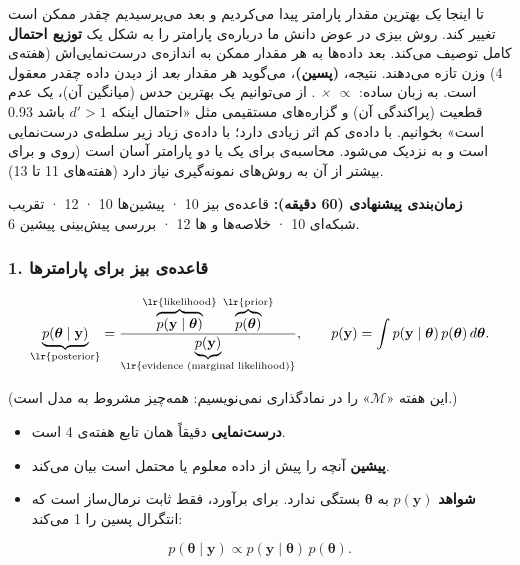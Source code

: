 تا اینجا \emph{یک} بهترین مقدار پارامتر پیدا می‌کردیم و بعد می‌پرسیدیم
چقدر ممکن است تغییر کند. روش بیزی در عوض دانش ما درباره‌ی پارامتر را به
شکل یک \textbf{توزیع احتمال} کامل توصیف می‌کند. بعد داده‌ها به هر مقدار
ممکن به اندازه‌ی درست‌نمایی‌اش (هفته‌ی 4) وزن تازه می‌دهند. نتیجه،
\textbf{ (پسین)}، می‌گوید هر مقدار \emph{بعد} از دیدن داده
چقدر معقول است. به زبان ساده: \emph{ \ensuremath{\propto}  ×
}. از  می‌توانیم یک بهترین حدس (میانگین آن)، یک
عدم قطعیت (پراکندگی آن) و گزاره‌های مستقیمی مثل «احتمال اینکه \(d' > 1\)
باشد 0.93 است» بخوانیم. با داده‌ی کم  اثر زیادی دارد؛ با داده‌ی
زیاد  زیر سلطه‌ی درست‌نمایی است و به  نزدیک می‌شود.
محاسبه‌ی  برای یک یا دو پارامتر آسان است (روی  و
برای بیشتر از آن به روش‌های نمونه‌گیری نیاز دارد (هفته‌های 11 تا 13).

\textbf{زمان‌بندی پیشنهادی (60 دقیقه):} قاعده‌ی بیز 10 · پیشین‌ها 10 ·
 12 · تقریب شبکه‌ای 10 · خلاصه‌ها و ها 12 · بررسی پیش‌بینی پیشین 6.

\subsubsection{1. قاعده‌ی بیز برای پارامترها}

\[
\underbrace{p(\boldsymbol\theta \mid \mathbf{y})}_{\text{\lr{posterior}}}
= \frac{\overbrace{p(\mathbf{y} \mid \boldsymbol\theta)}^{\text{\lr{likelihood}}}\;\overbrace{p(\boldsymbol\theta)}^{\text{\lr{prior}}}}{\underbrace{p(\mathbf{y})}_{\text{\lr{evidence (marginal likelihood)}}}},
\qquad
p(\mathbf{y}) = \int p(\mathbf{y}\mid\boldsymbol\theta)\,p(\boldsymbol\theta)\,d\boldsymbol\theta.
\]

(این هفته «\(\mathcal{M}\)» را در نمادگذاری نمی‌نویسیم: همه‌چیز مشروط به
مدل است.)

\begin{itemize}
\tightlist
\item
  \textbf{درست‌نمایی} دقیقاً همان تابع هفته‌ی 4 است.
\item
  \textbf{پیشین} آنچه را پیش از داده معلوم یا محتمل است بیان می‌کند.
\item
  \textbf{شواهد} \(p(\mathbf{y})\) به \(\boldsymbol\theta\) بستگی ندارد.
  برای برآورد، فقط ثابت نرمال‌ساز است که انتگرال پسین را 1 می‌کند:
\end{itemize}

\[
p(\boldsymbol\theta \mid \mathbf{y}) \propto p(\mathbf{y}\mid\boldsymbol\theta)\, p(\boldsymbol\theta).
\]


